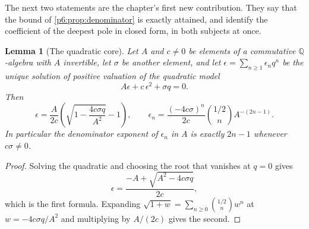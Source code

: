 \documentclass[11pt,a4paper,oneside]{book}
\theoremstyle{plain}
\newtheorem{lemma}[theorem]{Lemma}
\theoremstyle{definition}
\theoremstyle{remark}
\newcommand{\Rat}{\mathbb{Q}}
\begin{document}
The next two statements are the chapter's first new contribution.  They say
that the bound of \cref{p6:prop:denominator} is exactly attained, and identify
the coefficient of the deepest pole in closed form, in both subjects at once.

\begin{lemma}[The quadratic core]\label{p6:lem:quadratic-core}
Let $A$ and $c\ne0$ be elements of a commutative $\Rat$-algebra with $A$
invertible, let $\sigma$ be another element, and let
$\epsilon=\sum_{n\ge1}\epsilon_nq^{n}$ be the unique solution of positive
valuation of the \emph{quadratic model}
\begin{equation}\label{p6:eq:quadratic-model}
 A\epsilon+c\,\epsilon^{2}+\sigma q=0 .
\end{equation}
Then
\begin{equation}\label{p6:eq:quadratic-solution}
 \epsilon=\frac{A}{2c}\left(\sqrt{1-\frac{4c\sigma q}{A^{2}}}-1\right),
 \qquad
 \epsilon_n=\frac{(-4c\sigma)^{n}}{2c}\binom{1/2}{n}A^{-(2n-1)} .
\end{equation}
In particular the denominator exponent of $\epsilon_n$ in $A$ is exactly
$2n-1$ whenever $c\sigma\ne0$.
\end{lemma}

\begin{proof}
Solving the quadratic and choosing the root that vanishes at $q=0$ gives
\[
 \epsilon=\frac{-A+\sqrt{A^{2}-4c\sigma q}}{2c},
\]
which is the first formula.  Expanding $\sqrt{1+w}=\sum_{n\ge0}\binom{1/2}{n}w^{n}$ at
$w=-4c\sigma q/A^{2}$ and multiplying by $A/(2c)$ gives the second.
\end{proof}
\end{document}
